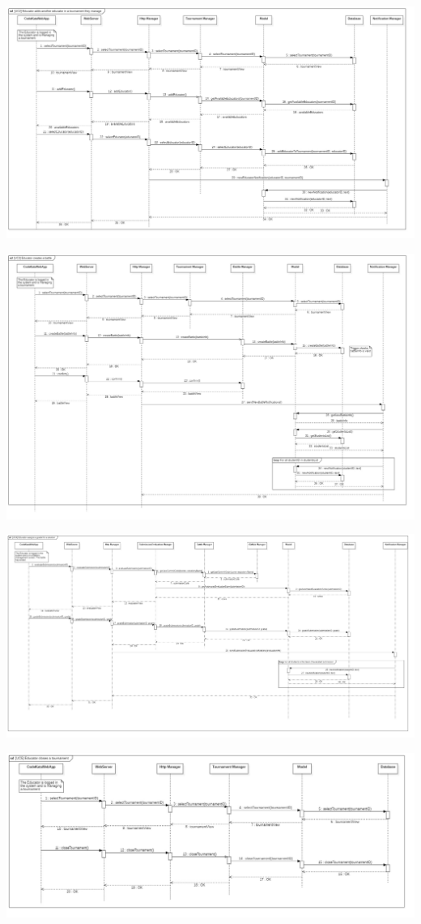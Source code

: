 \documentclass{article}
\begin{document}
\newpage
\begin{center}
    \includegraphics[angle=-90,width=0.73\linewidth]{uc2.jpg}
  \label{fig:uc2}
\end{center}

\newpage
\begin{center}
    \includegraphics[angle=-90,width=0.85\linewidth]{uc3.jpg}
  \label{fig:uc3}
\end{center}

\newpage
\begin{center}
    \includegraphics[angle=-90,width=0.63\linewidth]{uc4.jpg}
  \label{fig:uc4}
\end{center}

\newpage
\begin{center}
    \includegraphics[angle=-90,width=0.53\linewidth]{uc5.jpg}
  \label{fig:uc5}
\end{center}
\end{document}
